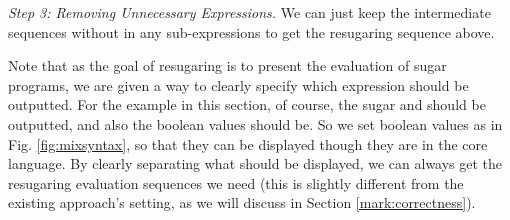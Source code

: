{\em Step 3: Removing Unnecessary Expressions.}
We can just keep the intermediate sequences without  in any sub-expressions to get the resugaring sequence above.

Note that as the goal of resugaring is to present the evaluation of sugar programs, we are given a way to clearly specify which expression should be outputted. For the example in this section, of course, the sugar  and  should be outputted, and also the boolean values should be. So we set boolean values as  in Fig. \ref{fig:mixsyntax}, so that they can be displayed though they are in the core language. By clearly separating what should be displayed, we can always get the resugaring evaluation sequences we need (this is slightly different from the existing approach's setting, as we will discuss in Section \ref{mark:correctness}).

